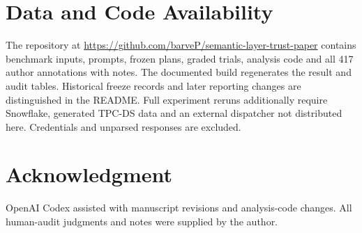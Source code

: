 \documentclass[conference]{IEEEtran}
\begin{document}
\section*{Data and Code Availability}

The repository at \url{https://github.com/barveP/semantic-layer-trust-paper} contains benchmark inputs, prompts, frozen plans, graded trials, analysis code and all 417 author annotations with notes. The documented build regenerates the result and audit tables. Historical freeze records and later reporting changes are distinguished in the README. Full experiment reruns additionally require Snowflake, generated TPC-DS data and an external dispatcher not distributed here. Credentials and unparsed responses are excluded.

\section*{Acknowledgment}

OpenAI Codex assisted with manuscript revisions and analysis-code changes. All human-audit judgments and notes were supplied by the author.



\end{document}
